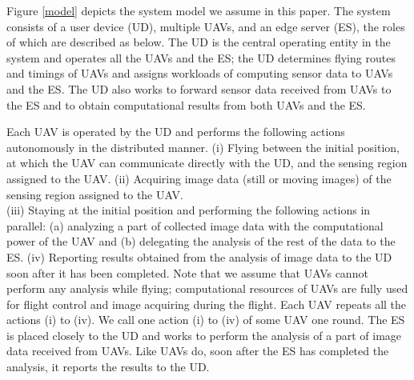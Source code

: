 \documentclass{ieeeaccess}
\begin{document}
Figure \ref{model} depicts the system model we assume in this paper. 
The system consists of a user device (UD), multiple UAVs, and an edge server (ES), the roles of which are described as below.
%
The UD is the central operating entity in the system and operates all the UAVs and the ES; the UD determines flying routes and timings of UAVs and assigns workloads of computing sensor data to UAVs and the ES.
%
The UD also works to forward sensor data received from UAVs to the ES and to obtain computational results from both UAVs and the ES.

Each UAV is operated by the UD and performs the following actions autonomously in the distributed manner.
%
(i) Flying between the initial position, at which the UAV can communicate directly with the UD, and the sensing region assigned to the UAV.
(i\hspace{-.1em}i) Acquiring image data (still or moving images) of the sensing region assigned to the UAV.\\
(i\hspace{-.1em}i\hspace{-.1em}i) Staying at the initial position and performing the following actions in parallel: (a) analyzing a part of collected image data with the computational power of the UAV and (b) delegating the analysis of the rest of the data to the ES.
(i\hspace{-.1em}v) Reporting results obtained from the analysis of image data to the UD soon after it has been completed.
%
Note that we assume that UAVs cannot perform any analysis while flying; computational resources of UAVs are fully used for flight control and image acquiring during the flight. Each UAV repeats all the actions (i) to (i\hspace{-.1em}v). We call one action (i) to (i\hspace{-.1em}v) of some UAV one round.
The ES is placed closely to the UD and works to perform the analysis of a part of image data received from UAVs.
%
Like UAVs do, soon after the ES has completed the analysis, it reports the results to the UD.
%
\end{document}
